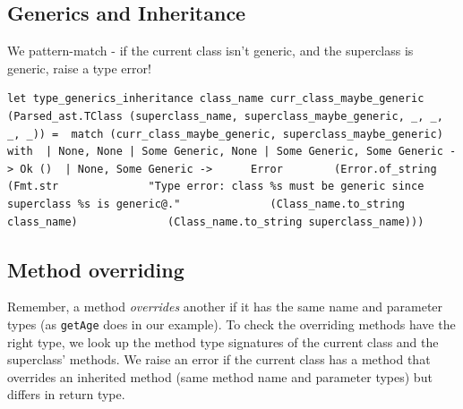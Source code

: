 \hypertarget{generics-and-inheritance}{%
\subsection{\texorpdfstring{\protect\hyperlink{generics-and-inheritance}{}Generics
and
Inheritance}{Generics and Inheritance}}\label{generics-and-inheritance}}

We pattern-match - if the current class isn't generic, and the
superclass is generic, raise a type error!

%

\begin{lstlisting}[language=caml,caption={type\_inheritance.ml}]
let type_generics_inheritance class_name curr_class_maybe_generic    (Parsed_ast.TClass (superclass_name, superclass_maybe_generic, _, _, _, _)) =  match (curr_class_maybe_generic, superclass_maybe_generic) with  | None, None | Some Generic, None | Some Generic, Some Generic -> Ok ()  | None, Some Generic ->      Error        (Error.of_string           (Fmt.str              "Type error: class %s must be generic since superclass %s is generic@."              (Class_name.to_string class_name)              (Class_name.to_string superclass_name)))
\end{lstlisting}

\hypertarget{method-overriding}{%
\subsection{\texorpdfstring{\protect\hyperlink{method-overriding}{}Method
overriding}{Method overriding}}\label{method-overriding}}

Remember, a method \emph{overrides} another if it has the same name and
parameter types (as \texttt{getAge} does in our example). To check the
overriding methods have the right type, we look up the method type
signatures of the current class and the superclass' methods. We raise an
error if the current class has a method that overrides an inherited
method (same method name and parameter types) but differs in return
type.

%

